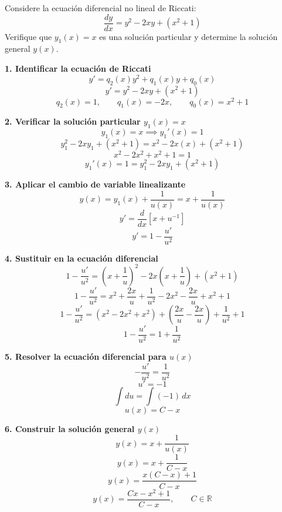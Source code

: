 \documentclass[11pt,a4paper]{article}
\newenvironment{solucion}[1][Solución Detallada]{%
    \vspace{1.5mm}%
    \noindent{\large\textbf{Solución:}}\par\vspace{1.5mm}%
}{%
    \par\vspace{3mm}%
}
\begin{document}
\vspace{3mm}

\begin{problema}[Problema 1.4]
Considere la ecuación diferencial no lineal de Riccati:
\[
\frac{dy}{dx} = y^2 - 2xy + (x^2 + 1)
\]
Verifique que $y_1(x) = x$ es una solución particular y determine la solución general $y(x)$.
\end{problema}

\begin{solucion}

\textbf{\large 1. Identificar la ecuación de Riccati}
\[
\boxed{y' = q_2(x)y^2 + q_1(x)y + q_0(x)}
\]
\[
y' = y^2 - 2xy + (x^2 + 1)
\]
\[
q_2(x) = 1, \qquad q_1(x) = -2x, \qquad q_0(x) = x^2 + 1
\]

\vspace{3.5mm}

\textbf{\large 2. Verificar la solución particular $y_1(x) = x$}
\[
y_1(x) = x \implies y_1'(x) = 1
\]
\[
y_1^2 - 2x y_1 + (x^2 + 1) = x^2 - 2x(x) + (x^2 + 1)
\]
\[
x^2 - 2x^2 + x^2 + 1 = 1
\]
\[
\boxed{y_1'(x) = 1 = y_1^2 - 2x y_1 + (x^2 + 1)}
\]

\vspace{3.5mm}

\textbf{\large 3. Aplicar el cambio de variable linealizante}
\[
\boxed{y(x) = y_1(x) + \frac{1}{u(x)} = x + \frac{1}{u(x)}}
\]
\[
y' = \frac{d}{dx}\left[x + u^{-1}\right]
\]
\[
\boxed{y' = 1 - \frac{u'}{u^2}}
\]

\vspace{3.5mm}

\textbf{\large 4. Sustituir en la ecuación diferencial}
\[
1 - \frac{u'}{u^2} = \left(x + \frac{1}{u}\right)^2 - 2x\left(x + \frac{1}{u}\right) + (x^2 + 1)
\]
\[
1 - \frac{u'}{u^2} = x^2 + \frac{2x}{u} + \frac{1}{u^2} - 2x^2 - \frac{2x}{u} + x^2 + 1
\]
\[
1 - \frac{u'}{u^2} = (x^2 - 2x^2 + x^2) + \left(\frac{2x}{u} - \frac{2x}{u}\right) + \frac{1}{u^2} + 1
\]
\[
1 - \frac{u'}{u^2} = 1 + \frac{1}{u^2}
\]

\vspace{3.5mm}

\textbf{\large 5. Resolver la ecuación diferencial para $u(x)$}
\[
-\frac{u'}{u^2} = \frac{1}{u^2}
\]
\[
\boxed{u' = -1}
\]
\[
\int du = \int (-1)\, dx
\]
\[
\boxed{u(x) = C - x}
\]

\vspace{3.5mm}

\textbf{\large 6. Construir la solución general $y(x)$}
\[
y(x) = x + \frac{1}{u(x)}
\]
\[
\boxed{y(x) = x + \frac{1}{C - x}}
\]
\[
y(x) = \frac{x(C - x) + 1}{C - x}
\]
\[
\boxed{y(x) = \frac{Cx - x^2 + 1}{C - x}, \qquad C \in \mathbb{R}}
\]


\end{solucion}
\end{document}
